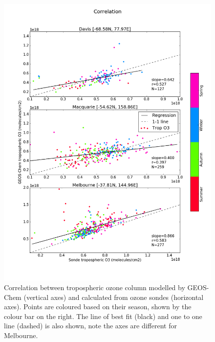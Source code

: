     \begin{figure}[!htbp]
      \includegraphics[width=\textwidth]{Figures/Ozone/station_correlations.png}
      \caption{Correlation between tropospheric ozone column modelled by GEOS-Chem (vertical axes) and calculated from ozone sondes (horizontal axes). 
      Points are coloured based on their season, shown by the colour bar on the right.
      The line of best fit (black) and one to one line (dashed) is also shown, note the axes are different for Melbourne.}
      \label{ch_o3:fig:GEOSChemTroposphereCorrelation}
    \end{figure}
    

